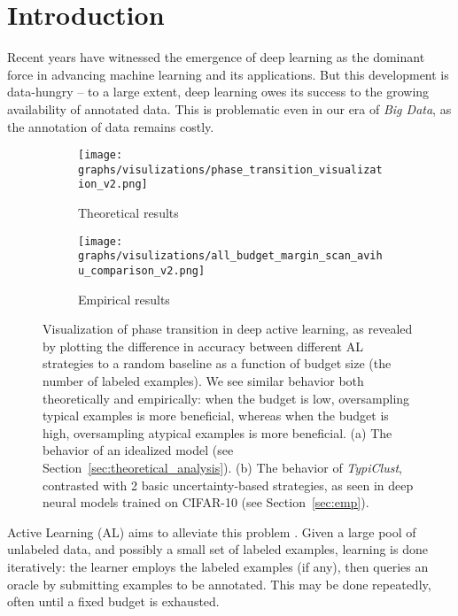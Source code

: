 \documentclass{article}
\begin{document}
\section{Introduction}

Recent years have witnessed the emergence of deep learning as the dominant force in advancing machine learning and its applications. But this development is data-hungry -- to a large extent, deep learning owes its success to the growing availability of annotated data. This is problematic even in our era of \emph{Big Data}, as the annotation of data remains costly.



\begin{figure}[thb]

\begin{subfigure}{.235\textwidth}
  \centering
 \texttt{[image: graphs/visulizations/phase\_transition\_visualization\_v2.png]}
\caption{Theoretical results}
\label{fig:example}
\end{subfigure}
\begin{subfigure}{.235\textwidth}
  \centering
 \texttt{[image: graphs/visulizations/all\_budget\_margin\_scan\_avihu\_comparison\_v2.png]}
\caption{Empirical results}
\label{fig:phase_transition_real}
\end{subfigure}


\vspace{-.2cm}
\caption{
Visualization of phase transition in deep active learning, as revealed by plotting the difference in accuracy between different AL strategies to a random baseline as a function of budget size (the number of labeled examples). We see similar behavior both theoretically and empirically: when the budget is low, oversampling typical examples is more beneficial, whereas when the budget is high, oversampling atypical examples is more beneficial. (a) The behavior of an idealized model (see Section~\ref{sec:theoretical_analysis}). (b) The behavior of \textit{TypiClust}, contrasted with 2 basic uncertainty-based strategies, as seen in deep neural models trained on CIFAR-10 (see Section~\ref{sec:emp}).} 
\vspace{-.25cm}
\end{figure}

Active Learning (AL)
aims to alleviate this problem \citep[see surveys in][] {settles.tr09,schroder2020survey}. Given a large pool of unlabeled data, and possibly a small set of labeled examples, learning is done iteratively: the learner employs the labeled examples (if any), then queries an oracle by submitting examples to be annotated. This may be done repeatedly, often until a fixed budget is exhausted.
\end{document}
